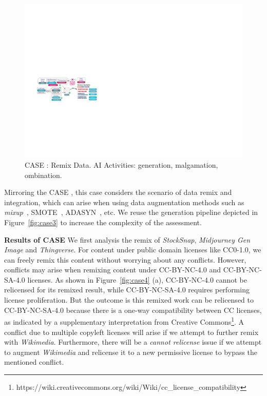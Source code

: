 \begin{figure}[h]
    \centering
    \includegraphics[width=\linewidth]{fig/case5.pdf}
    \caption{CASE : Remix Data. AI Activities: generation, malgamation, ombination.}
    \Description{}
    \label{fig:case5}
\end{figure}

Mirroring the CASE , this case considers the scenario of data remix and integration, which can arise when using data augmentation methods such as \textit{mixup}~\cite{zhang2018mixup}, SMOTE~\cite{chawla2002smote}, ADASYN~\cite{he2008adasyn}, etc.
We reuse the generation pipeline depicted in Figure~\ref{fig:case3} to increase the complexity of the assessment.

\textbf{Results of CASE }
We first analysis the remix of \textit{StockSnap}, \textit{Midjourney Gen Image} and \textit{Thingverse}.
For content under public domain licenses like CC0-1.0, we can freely remix this content without worrying about any conflicts.
However, conflicts may arise when remixing content under CC-BY-NC-4.0 and CC-BY-NC-SA-4.0 licenses.
As shown in Figure~\ref{fig:case4} (a), CC-BY-NC-4.0 cannot be relicensed for its remixed result, while CC-BY-NC-SA-4.0 requires performing license proliferation.
But the outcome is this remixed work can be relicensed to CC-BY-NC-SA-4.0 because there is a one-way compatibility between CC licenses, as indicated by a supplementary interpretation from Creative Commons\footnote{https://wiki.creativecommons.org/wiki/Wiki/cc\_license\_compatibility}.
A conflict due to multiple copyleft licenses will arise if we attempt to further remix with \textit{Wikimedia}.
Furthermore, there will be a \textit{cannot relicense} issue if we attempt to augment \textit{Wikimedia} and relicense it to a new permissive license to bypass the mentioned conflict.


